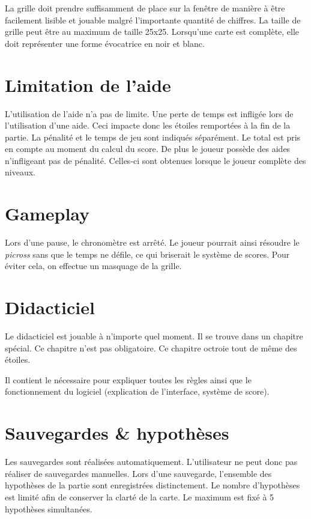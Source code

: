 \documentclass{report}
\begin{document}
		La grille doit prendre suffisamment de place sur la fenêtre de manière à être facilement lisible et jouable malgré l'importante quantité de chiffres. La taille de grille peut être au maximum de taille 25x25.
		Lorsqu'une carte est complète, elle doit représenter une forme évocatrice en noir et blanc.
	
	\section{Limitation de l'aide}
		L'utilisation de l'aide n'a pas de limite. Une perte de temps est infligée lors de l'utilisation d'une aide. Ceci impacte donc les étoiles remportées à la fin de la partie. La pénalité et le temps de jeu sont indiqués séparément. Le total est pris en compte au moment du calcul du score. De plus le joueur possède des aides n'infligeant pas de pénalité. Celles-ci sont obtenues lorsque le joueur complète des niveaux. 
	
	\section{Gameplay}
		Lors d'une pause, le chronomètre est arrêté. Le joueur pourrait ainsi résoudre le \textit{picross} sans que le temps ne défile, ce qui briserait le système de scores. Pour éviter cela, on effectue un masquage de la grille.
		
	\section{Didacticiel}
		Le didacticiel est jouable à n'importe quel moment. Il se trouve dans un chapitre spécial. Ce chapitre n'est pas obligatoire. Ce chapitre octroie tout de même des étoiles.
		
		Il contient le nécessaire pour expliquer toutes les règles ainsi que le fonctionnement du logiciel (explication de l'interface, système de score).
	
	\section{Sauvegardes \& hypothèses}
		Les sauvegardes sont réalisées automatiquement. L'utilisateur ne peut donc pas réaliser de sauvegardes manuelles. Lors d'une sauvegarde, l'ensemble des hypothèses de la partie sont enregistrées distinctement. Le nombre d'hypothèses est limité afin de conserver la clarté de la carte. Le maximum est fixé à 5 hypothèses simultanées.
	
\end{document}
